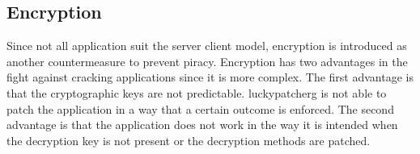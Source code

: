 \subsection{Encryption} \label{subsection:counter-replace-encryption-content}
Since not all application suit the server client model, encryption is introduced as another countermeasure to prevent piracy.
Encryption has two advantages in the fight against cracking applications since it is more complex.
The first advantage is that the cryptographic keys are not predictable.
\gls{luckypatcherg} is not able to patch the application in a way that a certain outcome is enforced.
The second advantage is that the application does not work in the way it is intended when the decryption key is not present or the decryption methods are patched.








